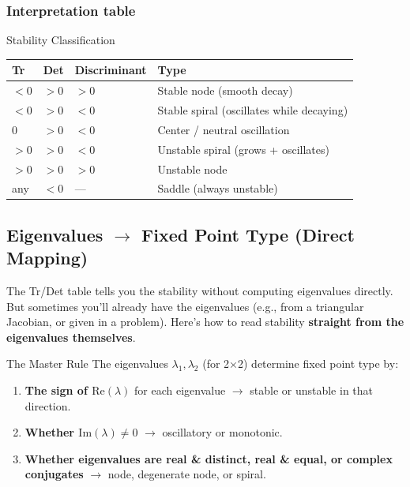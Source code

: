 \documentclass[11pt]{article}
\begin{document}
\subsubsection{Interpretation table}
\begin{summarybox}{Stability Classification}
\renewcommand{\arraystretch}{1.4}
\begin{tabular}{p{2.5cm}p{2.5cm}p{3cm}p{5cm}}
\toprule
\textbf{Tr} & \textbf{Det} & \textbf{Discriminant} & \textbf{Type}\\
\midrule
$<0$ & $>0$ & $>0$ & Stable node (smooth decay)\\
$<0$ & $>0$ & $<0$ & Stable spiral (oscillates while decaying)\\
$0$ & $>0$ & $<0$ & Center / neutral oscillation\\
$>0$ & $>0$ & $<0$ & Unstable spiral (grows + oscillates)\\
$>0$ & $>0$ & $>0$ & Unstable node\\
any & $<0$ & --- & Saddle (always unstable)\\
\bottomrule
\end{tabular}
\end{summarybox}

\subsection{Eigenvalues $\to$ Fixed Point Type (Direct Mapping)}

The Tr/Det table tells you the stability without computing eigenvalues directly. But sometimes you'll already have the eigenvalues (e.g., from a triangular Jacobian, or given in a problem). Here's how to read stability \textbf{straight from the eigenvalues themselves}.

\begin{conceptbox}{The Master Rule}
The eigenvalues $\lambda_1, \lambda_2$ (for 2$\times$2) determine fixed point type by:
\begin{enumerate}
\item \textbf{The sign of $\text{Re}(\lambda)$} for each eigenvalue $\to$ stable or unstable in that direction.
\item \textbf{Whether $\text{Im}(\lambda) \neq 0$} $\to$ oscillatory or monotonic.
\item \textbf{Whether eigenvalues are real \& distinct, real \& equal, or complex conjugates} $\to$ node, degenerate node, or spiral.
\end{enumerate}
\end{conceptbox}
\end{document}
